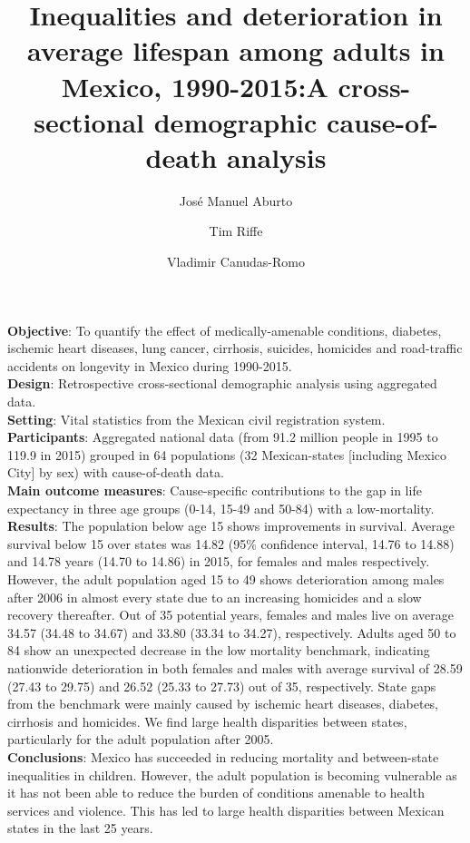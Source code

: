 \documentclass[11.5pt]{article}
\title{Inequalities and deterioration in average lifespan among adults in Mexico, 1990-2015:A cross-sectional demographic cause-of-death analysis}
\author[1]{Jos\'e Manuel Aburto}
\author[2]{Tim Riffe}
\author[3]{Vladimir Canudas-Romo}
\affil[1]{University of Southern Denmark}
\affil[2]{Max Planck Institute for Demographic Research}
\affil[3]{School of Demography, Australian National University}
\begin{document}
\newcommand{\vect}[1]{\boldsymbol{#1}}

\maketitle

\abstract
\textbf{Objective}: To quantify the effect of medically-amenable conditions, diabetes, ischemic heart diseases, lung cancer, cirrhosis, suicides, homicides and road-traffic accidents on longevity in Mexico during 1990-2015.\\

\textbf{Design}: Retrospective cross-sectional demographic analysis using aggregated data.\\

\textbf{Setting}: Vital statistics from the Mexican civil registration system.\\

\textbf{Participants}: Aggregated national data (from 91.2 million people in 1995 to 119.9 in 2015) grouped in 64 populations (32 Mexican-states [including Mexico City] by sex) with cause-of-death data.\\

\textbf{Main outcome measures}: Cause-specific contributions to the gap in life expectancy in three age groups (0-14, 15-49 and 50-84) with a low-mortality.\\

\textbf{Results}: The population below age 15 shows improvements in survival. Average survival below 15 over states was 14.82 (95\% confidence interval, 14.76 to 14.88) and 14.78 years (14.70 to 14.86) in 2015, for females and males respectively. However, the adult population aged 15 to 49 shows deterioration among males after 2006 in almost every state due to an increasing homicides and a slow recovery thereafter. Out of 35 potential years, females and males live on average 34.57 (34.48 to 34.67) and 33.80 (33.34 to 34.27), respectively. Adults aged 50 to 84 show an unexpected decrease in the low mortality benchmark, indicating nationwide deterioration in both females and males with average survival of 28.59 (27.43 to 29.75) and 26.52 (25.33 to 27.73) out of 35, respectively. State gaps from the benchmark were mainly caused by ischemic heart diseases, diabetes, cirrhosis and homicides. We find large health disparities between states, particularly for the adult population after 2005.\\

\textbf{Conclusions}: Mexico has succeeded in reducing mortality and between-state inequalities in children. However, the adult population is becoming vulnerable as it has not been able to reduce the burden of conditions amenable to health services and violence. This has led to large health disparities between Mexican states in the last 25 years.
\end{document}
